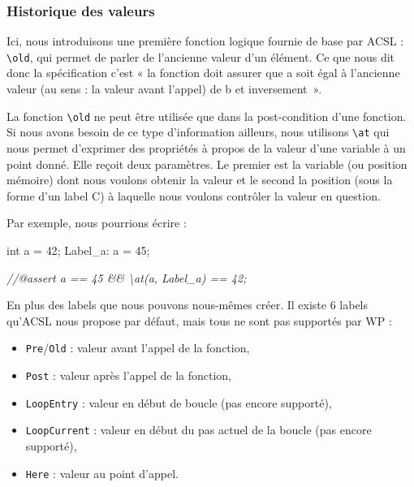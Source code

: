 \documentclass[12pt,francais,]{scrbook}
\newenvironment{Shaded}{}{}
\newcommand{\DataTypeTok}[1]{\textcolor[rgb]{0.56,0.13,0.00}{{#1}}}
\newcommand{\DecValTok}[1]{\textcolor[rgb]{0.25,0.63,0.44}{{#1}}}
\newcommand{\CommentTok}[1]{\textcolor[rgb]{0.38,0.63,0.69}{\textit{{#1}}}}
\newcommand{\NormalTok}[1]{{#1}}
\providecommand{\tightlist}{%
  \setlength{\itemsep}{0pt}\setlength{\parskip}{0pt}}
\begin{document}
\subsubsection{Historique des valeurs}\label{historique-des-valeurs}

Ici, nous introduisons une première fonction logique fournie de base par
ACSL : \texttt{\textbackslash{}old}, qui permet de parler de l'ancienne
valeur d'un élément. Ce que nous dit donc la spécification c'est « la
fonction doit assurer que a soit égal à l'ancienne valeur (au sens : la
valeur avant l'appel) de b et inversement~».

La fonction \texttt{\textbackslash{}old} ne peut être utilisée que dans
la post-condition d'une fonction. Si nous avons besoin de ce type
d'information ailleurs, nous utilisons \texttt{\textbackslash{}at} qui
nous permet d'exprimer des propriétés à propos de la valeur d'une
variable à un point donné. Elle reçoit deux paramètres. Le premier est
la variable (ou position mémoire) dont nous voulons obtenir la valeur et
le second la position (sous la forme d'un label C) à laquelle nous
voulons contrôler la valeur en question.

Par exemple, nous pourrions écrire :

\begin{footnotesize}\begin{Shaded}
\begin{Highlighting}[]
  \DataTypeTok{int} \NormalTok{a = }\DecValTok{42}\NormalTok{;}
 \NormalTok{Label_a:}
  \NormalTok{a = }\DecValTok{45}\NormalTok{;}

  \CommentTok{//@assert a == 45 && \textbackslash{}at(a, Label_a) == 42;}
\end{Highlighting}
\end{Shaded}\end{footnotesize}

En plus des labels que nous pouvons nous-mêmes créer. Il existe 6 labels
qu'ACSL nous propose par défaut, mais tous ne sont pas supportés par WP
:

\begin{itemize}
\tightlist
\item
  \texttt{Pre}/\texttt{Old} : valeur avant l'appel de la fonction,
\item
  \texttt{Post} : valeur après l'appel de la fonction,
\item
  \texttt{LoopEntry} : valeur en début de boucle (pas encore supporté),
\item
  \texttt{LoopCurrent} : valeur en début du pas actuel de la boucle (pas
  encore supporté),
\item
  \texttt{Here} : valeur au point d'appel.
\end{itemize}
\end{document}
